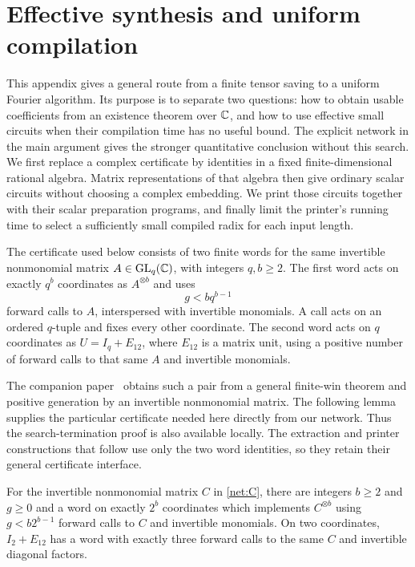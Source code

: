 \section{Effective synthesis and uniform compilation}
\label{syn:section}
\label{sec:synthesis}

This appendix gives a general route from a finite tensor saving to a
uniform Fourier algorithm.  Its purpose is to separate two questions:
how to obtain usable coefficients from an existence theorem over $\mathbb C$,
and how to use effective small circuits when their compilation time has
no useful bound.  The explicit network in the main argument gives the
stronger quantitative conclusion without this search.
We first replace a complex certificate by identities in a fixed
finite-dimensional rational algebra.  Matrix representations of that
algebra then give ordinary scalar circuits without choosing a complex
embedding.  We print those circuits together with their scalar
preparation programs, and finally limit the printer's running time to
select a sufficiently small compiled radix for each input length.

The certificate used below consists of two finite words for the same
invertible nonmonomial matrix $A\in\operatorname{GL}_q(\mathbb C)$, with integers
$q,b\ge2$. The first word acts on exactly
$q^b$ coordinates as $A^{\otimes b}$ and uses
\begin{equation}\label{syn:win}
 g<bq^{b-1}
\end{equation}
forward calls to $A$, interspersed with invertible monomials. A call
acts on an ordered $q$-tuple and fixes every other coordinate. The
second word acts on $q$ coordinates as $U=I_q+E_{12}$, where $E_{12}$
is a matrix unit, using a positive number of forward calls to that same
$A$ and invertible monomials.

The companion paper~\cite[Theorem~8.3 and Lemma~2.2]{exactfourier}
obtains such a pair from a general finite-win theorem and positive
generation by an invertible nonmonomial matrix. The following lemma
supplies the particular certificate needed here directly from our
network. Thus the search-termination proof is also available locally.
The extraction and printer constructions that follow use only the two
word identities, so they retain their general certificate interface.

\begin{lemma}
\label{syn:local-certificate}
For the invertible nonmonomial matrix $C$ in \eqref{net:C}, there are
integers $b\ge2$ and $g\ge0$ and a word on exactly $2^b$ coordinates
which implements $C^{\otimes b}$ using $g<b2^{b-1}$ forward calls to
$C$ and invertible monomials. On two coordinates, $I_2+E_{12}$ has a
word with exactly three forward calls to the same $C$ and invertible
diagonal factors.
\end{lemma}

